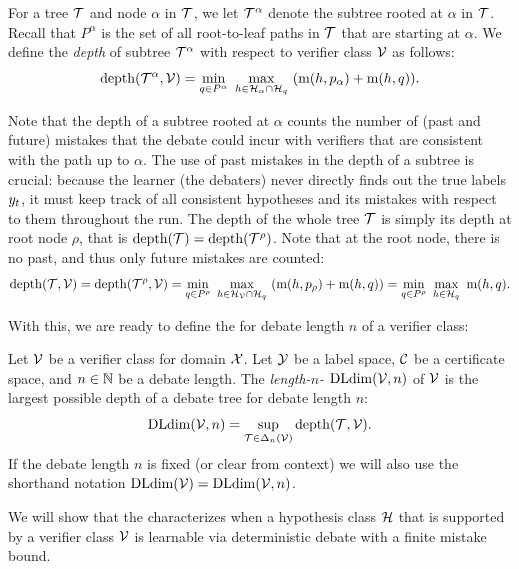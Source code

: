 \documentclass[anon]{alt2027} %
\begin{document}
For a tree ${\mathcal T}$ and node $\alpha$ in ${\mathcal T}$, we let ${\mathcal T}^\alpha$ denote the subtree rooted at $\alpha$ in ${\mathcal T}$. Recall that $P^\alpha$ is the set of all root-to-leaf paths in ${\mathcal T}$ that are starting at $\alpha$.
We define the \emph{depth} of subtree ${\mathcal T}^\alpha$ with respect to verifier class ${\mathcal V}$ as follows:
\[
\mathrm{depth}({\mathcal T}^\alpha, {\mathcal V}) = \min_{q\in P^\alpha}~ \max_{h\in {{\mathcal H}}_\alpha \cap {{\mathcal H}}_q}~  ( \mathrm{m}(h, p_\alpha) + \mathrm{m}(h, q) ).
\]

Note that the depth of a subtree rooted at $\alpha$ counts the number of (past and future) mistakes that the debate could incur with verifiers that are consistent with the path up to $\alpha$.
The use of past mistakes in the depth of a subtree is crucial: because the learner (the debaters) never directly finds out the true  labels $y_t$, it must keep track of all consistent hypotheses and its mistakes with respect to them throughout the run.
The depth of the whole tree ${\mathcal T}$ is simply its depth at root node $\rho$, that is $\mathrm{depth}({\mathcal T}) = \mathrm{depth}({\mathcal T}^\rho)$. Note that at the root node, there is no past, and thus only future mistakes are counted:
\[
\mathrm{depth}({\mathcal T},{\mathcal V}) = \mathrm{depth}({\mathcal T}^\rho,{\mathcal V}) = \min_{q\in P^\rho}~ \max_{h\in {{\mathcal H}}_{\mathcal V} \cap {{\mathcal H}}_q}~  ( \mathrm{m}(h, p_\rho) + \mathrm{m}(h, q) )  = \min_{q\in P^\rho}~ \max_{h\in {{\mathcal H}}_{q}}~    \mathrm{m}(h, q).
\]

%
With this, we are ready to define the \emph{\debatedimname} for debate length $n$ of a verifier class:
\begin{definition}[\debatedimname]
 Let ${\mathcal V}$ be a verifier class for domain ${\mathcal X}$. Let ${\mathcal Y}$ be a label space, ${{\mathcal C}}$ be a certificate space, and $n\in\mathbb{N}$ be a debate length. The \emph{length-$n$-\debatedimname} $\mathrm{DLdim}({\mathcal V}, n)$ of ${\mathcal V}$ is the largest possible depth of a debate tree for debate length $n$:
 \[
  \mathrm{DLdim}({\mathcal V}, n) = \sup_{{\mathcal T}\in\Delta_n({\mathcal V})} \mathrm{depth}({\mathcal T},{\mathcal V}).
 \]
If the debate length $n$ is fixed (or clear from context) we will also use the shorthand notation $\mathrm{DLdim}({\mathcal V}) =   \mathrm{DLdim}({\mathcal V}, n)$.
\end{definition}
We will show that the \debatedimname characterizes when a hypothesis class ${{\mathcal H}}$ that is supported by a verifier class ${\mathcal V}$ is learnable via deterministic debate with a finite mistake bound. 
\end{document}
